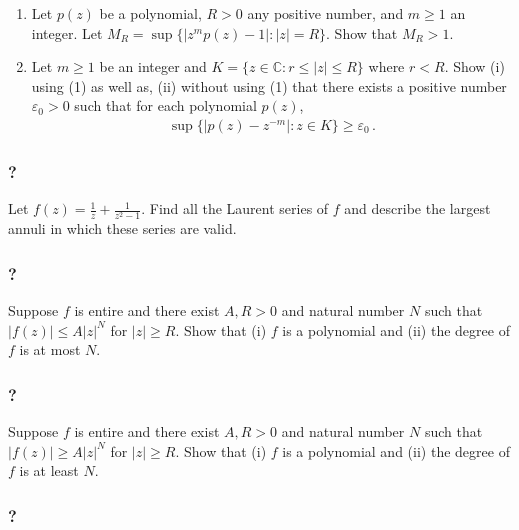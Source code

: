 \begin{enumerate}
\def\labelenumi{(\arabic{enumi})}
\item
  Let \(p(z)\) be a polynomial, \(R>0\) any positive number, and
  \(m \geq 1\) an integer. Let
  \(M_R = \sup \{ |z^{m} p(z) - 1|: |z| = R \}\). Show that \(M_R>1\).
\item
  Let \(m \geq 1\) be an integer and
  \(K = \{z \in {\mathbb C}: r \leq |z| \leq R \}\) where \(r<R\). Show
  (i) using (1) as well as, (ii) without using (1) that there exists a
  positive number \(\varepsilon_0>0\) such that for each polynomial
  \(p(z)\),
  \begin{align*}\sup \{|p(z) - z^{-m}|: z \in K  \} \geq \varepsilon_0 \, .\end{align*}
\end{enumerate}

\hypertarget{section-162}{%
\subsubsection{?}\label{section-162}}

Let \(\displaystyle f(z) = \frac{1}{z} + \frac{1}{z^2 -1}\). Find all
the Laurent series of \(f\) and describe the largest annuli in which
these series are valid.

\hypertarget{section-163}{%
\subsubsection{?}\label{section-163}}

Suppose \(f\) is entire and there exist \(A, R >0\) and natural number
\(N\) such that \(|f(z)| \leq A |z|^N\) for \(|z| \geq R\). Show that
(i) \(f\) is a polynomial and (ii) the degree of \(f\) is at most \(N\).

\hypertarget{section-164}{%
\subsubsection{?}\label{section-164}}

Suppose \(f\) is entire and there exist \(A, R >0\) and natural number
\(N\) such that \(|f(z)| \geq A |z|^N\) for \(|z| \geq R\). Show that
(i) \(f\) is a polynomial and (ii) the degree of \(f\) is at least
\(N\).

\hypertarget{section-165}{%
\subsubsection{?}\label{section-165}}

